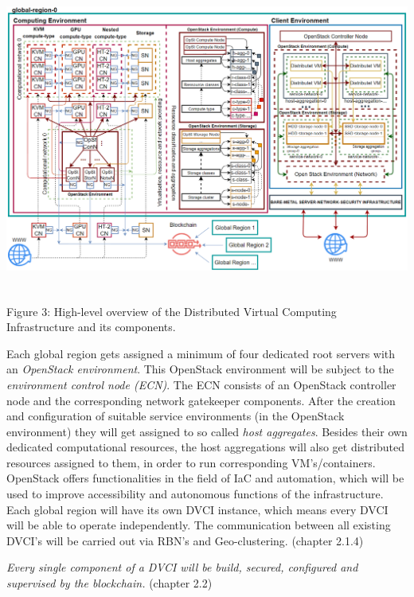 \documentclass[]{article}
\begin{document}
\begin{center}
	\includegraphics[height=10cm]{dvci-arch-overview}
\end{center}
\begin{center}
	Figure 3: High-level overview of the Distributed Virtual Computing Infrastructure and its components.
\end{center}

Each global region gets assigned a minimum of four dedicated root servers with an \textit{OpenStack environment}.
This OpenStack environment will be subject to the \textit{environment control node (ECN)}.
The ECN consists of an OpenStack controller node and the corresponding network gatekeeper components. 
After the creation and configuration of suitable service environments (in the OpenStack environment) they will get assigned to so called \textit{host aggregates}. 
Besides their own dedicated computational resources, the host aggregations will also get distributed resources assigned to them, in order to run corresponding VM's/containers.
OpenStack offers functionalities in the field of IaC and automation, which will be used to improve accessibility and autonomous functions of the infrastructure.
Each global region will have its own DVCI instance, which means every DVCI will be able to operate independently.
The communication between all existing DVCI's will be carried out via RBN's and Geo-clustering. (chapter 2.1.4)

\textit{Every single component of a DVCI will be build, secured, configured and supervised by the blockchain.} (chapter 2.2)

\end{document}
